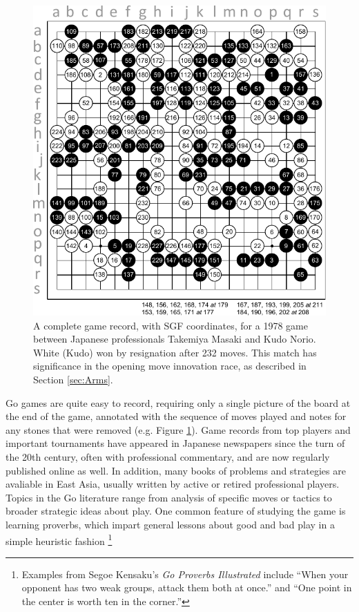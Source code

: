 \begin{figure}[t]
\begin{center} 
\includegraphics[scale=0.8]{figures/gofirstmove/figKifu.pdf}
\caption{A complete game record, with SGF coordinates, for a 1978 game between Japanese professionals Takemiya Masaki and Kudo Norio.  White (Kudo) won by resignation after 232 moves.  This match has significance in the opening move innovation race, as described in Section \ref{sec:Arms}.}
\label{fig:Kifu}
\end{center}
\end{figure}
 
Go games are quite easy to record, requiring only a single picture of the board at the end of the game, annotated with the sequence of moves played and notes for any stones that were removed (e.g. Figure \ref{fig:Kifu}).  Game records from top players and important tournaments have appeared in Japanese newspapers since the turn of the 20th century, often with professional commentary, and are now regularly published online as well.  In addition, many books of problems and strategies are avaliable in East Asia, usually written by active or retired professional players.  Topics in the Go literature range from analysis of specific moves or tactics to broader strategic ideas about play.  One common feature of studying the game is learning proverbs, which impart general lessons about good and bad play in a simple heuristic fashion \footnote{Examples from Segoe Kensaku's \textit{Go Proverbs Illustrated} \citeyearpar{Segoe1960} include ``When your opponent has two weak groups, attack them both at once.'' and ``One point in the center is worth ten in the corner.''}

